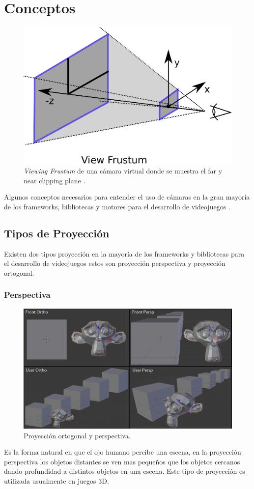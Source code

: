 \section{Conceptos}
\begin{figure}
\includegraphics[width=\linewidth]{media/frustum.eps}
\caption{\emph{Viewing Frustum} de una cámara virtual donde se muestra el far y near clipping plane \cite{microsoft_frustum}.}
\label{fig:frustum}
\end{figure}
Algunos conceptos necesarios para entender el uso de cámaras en la gran mayoría de los frameworks, bibliotecas y motores para el desarrollo de videojuegos \cite{unity_camera}.
\subsection{Tipos de Proyección}
Existen dos tipos proyección en la mayoría de los frameworks y bibliotecas para el desarrollo de videojuegos estos son proyección perspectiva y proyección ortogonal.
\subsubsection{Perspectiva}
\setlength\intextsep{0pt}
\begin{figure}
\includegraphics[width=\linewidth]{media/projections.png}
\caption{Proyección ortogonal y perspectiva.}
\end{figure}
Es la forma natural en que el ojo humano percibe una escena, en la proyección perspectiva los objetos distantes se ven mas pequeños que los objetos cercanos dando profundidad a distintos objetos en una escena. Este tipo de proyección es utilizada usualmente en juegos 3D.
